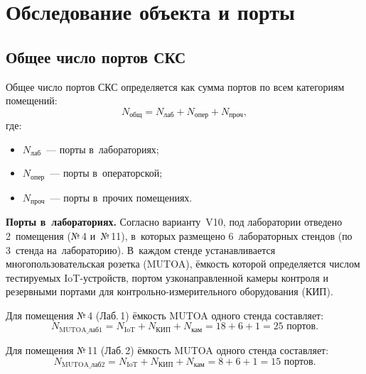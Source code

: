 \documentclass{bmstu}
\begin{document}

\chapter{Обследование объекта и порты}

\section{Общее число портов СКС}

Общее число портов СКС определяется как сумма портов по всем категориям помещений:
\begin{equation}
    N_{\text{общ}} = N_{\text{лаб}} + N_{\text{опер}} + N_{\text{проч}},
    \label{eq:n_total}
\end{equation}
где:
\begin{itemize}
    \item $N_{\text{лаб}}$~--- порты в~лабораториях;
    \item $N_{\text{опер}}$~--- порты в~операторской;
    \item $N_{\text{проч}}$~--- порты в~прочих помещениях.
\end{itemize}

\textbf{Порты в~лабораториях.} Согласно варианту~V10, под лаборатории отведено 2~помещения (№\,4 и~№\,11), в~которых размещено 6~лабораторных стендов (по 3~стенда на~лабораторию). В~каждом стенде устанавливается многопользовательская розетка (MUTOA), ёмкость которой определяется числом тестируемых IoT-устройств, портом узконаправленной камеры контроля и резервными портами для контрольно-измерительного оборудования (КИП).

Для помещения №\,4 (Лаб.\,1) ёмкость MUTOA одного стенда составляет:
\begin{equation}
    N_{\text{MUTOA\_лаб1}} = N_{\text{IoT}} + N_{\text{КИП}} + N_{\text{кам}} = 18 + 6 + 1 = 25 \text{ портов}.
    \label{eq:mutoa_lab1}
\end{equation}

Для помещения №\,11 (Лаб.\,2) ёмкость MUTOA одного стенда составляет:
\begin{equation}
    N_{\text{MUTOA\_лаб2}} = N_{\text{IoT}} + N_{\text{КИП}} + N_{\text{кам}} = 8 + 6 + 1 = 15 \text{ портов}.
    \label{eq:mutoa_lab2}
\end{equation}
\end{document}
